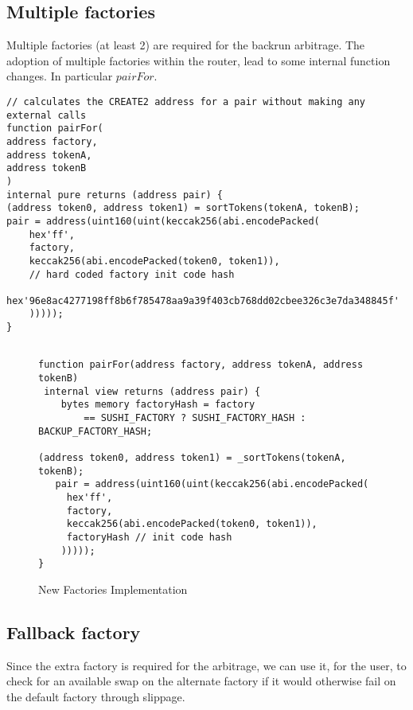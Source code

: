 \documentclass[runningheads]{llncs}
\begin{document}
\newpage 

\subsection{Multiple factories}
Multiple factories (at least 2) are required for the backrun arbitrage. The adoption of multiple factories within the router, lead to some internal function changes. In particular $pairFor$.

\label{CREATE2 Factory:3}
\begin{verbatim}
// calculates the CREATE2 address for a pair without making any external calls
function pairFor(
address factory, 
address tokenA, 
address tokenB
) 
internal pure returns (address pair) {
(address token0, address token1) = sortTokens(tokenA, tokenB);
pair = address(uint160(uint(keccak256(abi.encodePacked(
    hex'ff',
    factory,
    keccak256(abi.encodePacked(token0, token1)),
    // hard coded factory init code hash
    hex'96e8ac4277198ff8b6f785478aa9a39f403cb768dd02cbee326c3e7da348845f'
    )))));
}
\end{verbatim}
\newpage 

\begin{figure}
    \centering
    \caption{New Factories Implementation}
    \label{fig:New Factories}
\begin{verbatim}

function pairFor(address factory, address tokenA, address tokenB) 
 internal view returns (address pair) {
    bytes memory factoryHash = factory
        == SUSHI_FACTORY ? SUSHI_FACTORY_HASH : BACKUP_FACTORY_HASH;

(address token0, address token1) = _sortTokens(tokenA, tokenB);
   pair = address(uint160(uint(keccak256(abi.encodePacked(
     hex'ff',
     factory,
     keccak256(abi.encodePacked(token0, token1)),
     factoryHash // init code hash
    )))));
}
\end{verbatim}
\end{figure}

\subsection{Fallback factory}
Since the extra factory is required for the arbitrage, we can use it, for the user, to check for an available swap on the alternate factory if it would otherwise fail on the default factory through slippage.
\end{document}
